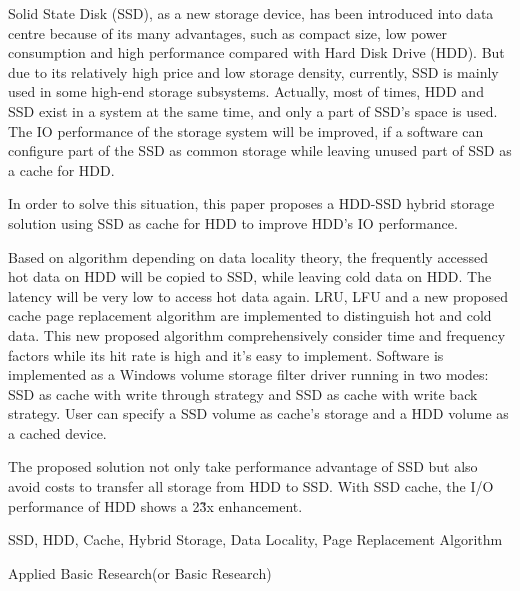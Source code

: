 \begin{eabstract}

Solid State Disk (SSD), as a new storage device, has been introduced into data centre because of its many advantages, such as compact size, low power consumption and high performance compared with Hard Disk Drive (HDD). But due to its relatively high price and low storage density, currently, SSD is mainly used in some high-end storage subsystems. Actually, most of times, HDD and SSD exist in a system at the same time, and only a part of SSD's space is used. The IO performance of the storage system will be improved, if a software can configure part of the SSD as common storage while leaving unused part of SSD as a cache for HDD.

In order to solve this situation, this paper proposes a HDD-SSD hybrid storage solution using SSD as cache for HDD to improve HDD's IO performance.

Based on algorithm depending on data locality theory, the frequently accessed hot data on HDD will be copied to SSD, while leaving cold data on HDD. The latency will be very low to access hot data again. LRU, LFU and a new proposed cache page replacement algorithm are implemented to distinguish hot and cold data. This new proposed algorithm comprehensively consider time and frequency factors while its hit rate is high and it's easy to implement. Software is implemented as a Windows volume storage filter driver running in two modes: SSD as cache with write through strategy and SSD as cache with write back strategy. User can specify a SSD volume as cache's storage and a HDD volume as a cached device.  

The proposed solution not only take performance advantage of SSD but also avoid costs to transfer all storage from HDD to SSD. With SSD cache, the I/O performance of HDD shows a 2\~3x enhancement.

\end{eabstract}

\begin{ekeywords}
SSD, HDD, Cache, Hybrid Storage, Data Locality, Page Replacement Algorithm
\end{ekeywords}

\begin{ethesistype}
Applied Basic Research(or Basic Research)
\end{ethesistype}

